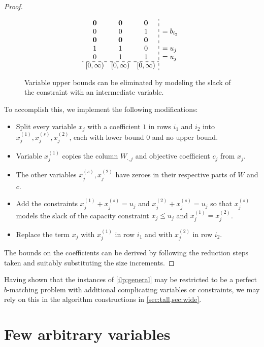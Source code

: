 \documentclass[a4paper,UKenglish,cleveref,thm-restate]{lipics-v2021}
\makeatletter
\newcommand{\veczero}{\mathbf0}
\newenvironment{cdisplaymath}{\@fleqnfalse\begin{displaymath}}{\end{displaymath}}
\makeatother
\begin{document}
\begin{proof}
\begin{claimproof}
\begin{figure}[H]
\begin{cdisplaymath}
\begin{array}{c c c:l}
                    \veczero&\veczero&\veczero\\
                    0&0&1&=b_{i_2}\\
                    \veczero&\veczero&\veczero\\
                    1&1&0&=u_j\\
                    0&1&1&=u_j\\
                    \cdashline{1-3}{}
                    [0,\infty)&[0,\infty)&[0,\infty)&
                \end{array}
            \end{cdisplaymath}
            \caption{Variable upper bounds can be eliminated by modeling the slack of the constraint with an intermediate variable.}
            \label{fig:capacity-elimination}
        \end{figure}
        To accomplish this, we implement the following modifications:
        \begin{itemize}
            \item Split every variable $x_j$ with a coefficient $1$ in rows $i_1$ and $i_2$ into $x_j^{(1)},x_j^{(s)},x_j^{(2)}$, each with lower bound $0$ and no upper bound.
            \item Variable $x_j^{(1)}$ copies the column $W_{\cdot,j}$ and objective coefficient $c_j$ from $x_j$.
            \item The other variables $x_j^{(s)},x_j^{(2)}$ have zeroes in their respective parts of $W$ and $c$.
            \item Add the constraints $x_j^{(1)}+x_j^{(s)}=u_j$ and $x_j^{(2)}+x_j^{(s)}=u_j$ so that $x_j^{(s)}$ models the slack of the capacity constraint $x_j\le u_j$ and $x_j^{(1)}=x_j^{(2)}$.
            \item Replace the term $x_j$ with $x_j^{(1)}$ in row $i_1$ and with $x_j^{(2)}$ in row $i_2$.
        \end{itemize}
    \end{claimproof}

    The bounds on the coefficients can be derived by following the reduction steps taken and suitably substituting the size increments.
\end{proof}

Having shown that the instances of \cref{ilp:general} may be restricted to be a perfect $b$-matching problem with additional complicating variables or constraints, we may rely on this in the algorithm constructions in \cref{sec:tall,sec:wide}. 
\section{Few arbitrary variables}
\label{sec:tall}
\end{document}
